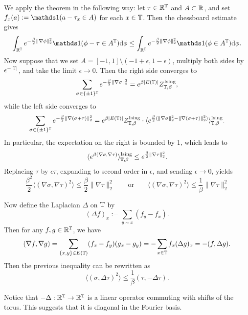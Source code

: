 We apply the theorem in the following way:
let $\tau\in\mathbb R^\mathbb T$ and $A\subset\mathbb R$, and set $f_x(a) := \true{a-\tau_x\in A}$ for each $x\in \mathbb T$.
Then the chessboard estimate gives
\[
    \int_{\R^\T}
    e^{-\frac\beta2 \|\nabla\phi\|_2^2} \true{\phi-\tau\in A^\T} \diff\phi
    \leq
    \int_{\R^\T}
    e^{-\frac\beta2 \|\nabla\phi\|_2^2} \true{\phi\in A^\T} \diff\phi.
\]
Now suppose that we set $A=[-1,1]\setminus(-1+\epsilon,1-\epsilon)$,
multiply both sides by $\epsilon^{-|\mathbb T|}$, and take the limit $\epsilon\to 0$.
Then the right side converges to
\[
    \sum_{\sigma\in\{\pm 1\}^\mathbb T} e^{-\frac\beta2 \|\nabla\sigma\|_2^2}
    =
    e^{\beta |E(\mathbb T)|}
    Z_{\mathbb T,\beta}^{\operatorname{Ising}},
\]
while the left side converges to
\[
    \sum_{\sigma\in\{\pm 1\}^\mathbb T} e^{-\frac\beta2 \|\nabla(\sigma+\tau)\|_2^2}=
    e^{\beta |E(\mathbb T)|}
    Z_{\mathbb T,\beta}^{\operatorname{Ising}}\cdot
    \langle
    e^{\frac\beta2 (\|\nabla\sigma\|_2^2-\|\nabla (\sigma+\tau)\|_2^2)}
    \rangle_{\mathbb T,\beta}^{\operatorname{Ising}}.
\]
In particular, the expectation on the right is bounded by $1$, which leads to
\[
    \langle
    e^{\beta (\nabla\sigma,\nabla\tau)}
    \rangle_{\mathbb T,\beta}^{\operatorname{Ising}}
    \leq e^{\frac\beta2 \|\nabla\tau\|_2^2}.
\]
Replacing $\tau$ by $\epsilon\tau$, expanding to second order in $\epsilon$, and sending
$\epsilon\to0$,
yields
\[
    \frac{\beta^2}2
    \langle (\nabla\sigma,\nabla\tau)^2\rangle \leq \frac\beta2 \|\nabla\tau\|_2^2
    \qquad
    \text{or}
    \qquad
    \langle (\nabla\sigma,\nabla\tau)^2\rangle \leq \frac1\beta \|\nabla\tau\|_2^2
\]

Now define the Laplacian $\Delta$ on $\mathbb T$ by
\[
    (\Delta f)_x := \sum_{y\sim x} (f_y - f_x).
\]
Then for any $f,g\in\mathbb R^\mathbb T$, we have
\begin{equation*}
    (\nabla f,\nabla g) = \sum_{\{x,y\}\in E(\mathbb T)} (f_x-f_y)(g_x-g_y) = -\sum_{x\in \mathbb T}
    f_x (\Delta g)_x = -(f,\Delta g).
\end{equation*}
Then the previous inequality can be rewritten as
\begin{equation}
    \label{eq:Gaussian_domination_real}
    \langle
    (\sigma,\Delta\tau)^2
    \rangle
    \leq \frac1\beta(\tau,-\Delta\tau).
\end{equation}

Notice that $-\Delta:\mathbb R^\mathbb T\to\mathbb R^\mathbb T$ is a linear operator commuting with shifts
of the torus.
This suggests that it is diagonal in the Fourier basis.

